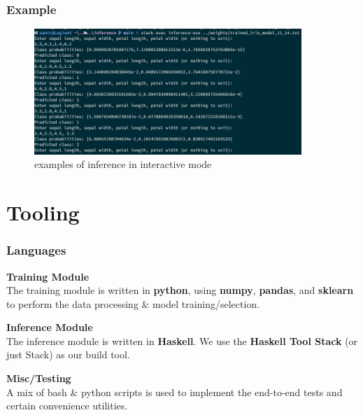 \documentclass{beamer}
\begin{document}
\begin{frame}
  \frametitle{Example}
  \begin{figure}
    \includegraphics[width=0.9\textwidth]{../images/examples.png}
    \caption{examples of inference in interactive mode}
  \end{figure}
\end{frame}

\section{Tooling}

\begin{frame}
  \frametitle{Languages}

  \textbf{Training Module}\\
  The training module is written in \textbf{python}, using \textbf{numpy}, \textbf{pandas}, and \textbf{sklearn} to perform the data processing \& model training/selection.\bigskip

  \textbf{Inference Module}\\
  The inference module is written in \textbf{Haskell}. We use the \textbf{Haskell Tool Stack} (or just Stack) as our build tool.\bigskip

  \textbf{Misc/Testing}\\
  A mix of bash \& python scripts is used to implement the end-to-end tests and certain convenience utilities.
\end{frame}
\end{document}
